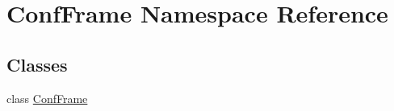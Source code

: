 \hypertarget{namespaceConfFrame}{}\section{Conf\+Frame Namespace Reference}
\label{namespaceConfFrame}
\subsection*{Classes}
\begin{DoxyCompactItemize}
\item 
class \hyperlink{classConfFrame_1_1ConfFrame}{Conf\+Frame}
\end{DoxyCompactItemize}
